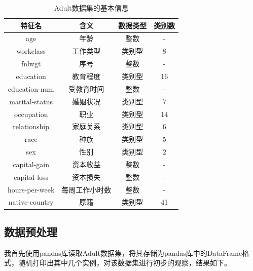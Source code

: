 \documentclass[12pt,a4paper]{article}
\theoremstyle{definition}
\begin{document}
\begin{table}[H]
	\renewcommand\arraystretch{1.15}
	\caption{Adult数据集的基本信息}
	\label{tab:feature-info}
	\centering
	
	\begin{tabular}{c|c|c|c}
		\centering
		 特征名 & 含义 & 数据类型 & 类别数 \\
		\hline
		\hline
		age & 年龄 & 整数 & - \\
		workclass & 工作类型 & 类别型 & 8 \\
		fnlwgt & 序号 & 整数 & - \\
		education & 教育程度 & 类别型 & 16 \\
		education-num & 受教育时间 & 整数 & - \\
		marital-status & 婚姻状况 & 类别型 & 7 \\
		occupation & 职业 & 类别型 & 14 \\
		relationship & 家庭关系 & 类别型 & 6 \\
		race & 种族 & 类别型 & 5 \\
		sex & 性别 & 类别型 & 2 \\
		capital-gain & 资本收益 & 整数 & - \\
		capital-loss & 	资本损失 & 整数 & - \\
		hours-per-week & 每周工作小时数 & 整数 & - \\
		native-country & 原籍 & 类别型 & 41 \\
		
	\end{tabular}
\end{table}

\subsection{数据预处理}

我首先使用pandas库读取Adult数据集，将其存储为pandas库中的DataFrame格式，随机打印出其中几个实例，对该数据集进行初步的观察，结果如下。
\end{document}
